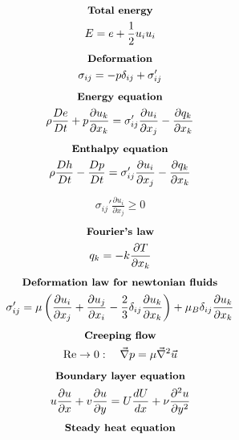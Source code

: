 \documentclass[10pt, a4paper]{article}
\newcommand{\derivative}[2]{\frac{\partial #1}{\partial #2}}
\begin{document}
\begin{multicols*}{2}
\begin{gather*}
        \textbf{\small Total energy} \\
        E = e + \frac12 u_i u_i
    \end{gather*}
    \begin{gather*}
        \textbf{\small Deformation} \\
        \sigma_{ij} = -p \delta_{ij} + \sigma_{ij}'
    \end{gather*}
    \begin{gather*}
        \textbf{\small Energy equation} \\
        \rho \frac{De}{Dt} + p\derivative{ u_k}{x_k} =
        \sigma_{ij}' \derivative{ u_i}{x_j}  - \derivative{ q_k}{x_k}
    \end{gather*}
    \begin{gather*}
        \textbf{\small Enthalpy equation} \\
        \rho \frac{Dh}{Dt} - \frac{Dp}{Dt} =
        \sigma_{ij}' \derivative{ u_i}{x_j}  - \derivative{ q_k}{x_k}
    \end{gather*}
    \begin{gather*}
        \sigma_{ij}' \derivative{ u_i}{x_j} \geq 0
    \end{gather*}
    \begin{gather*}
        \textbf{\small Fourier's law} \\
        q_k = -k\derivative{ T}{x_k}
    \end{gather*}
    \begin{gather*}
        \textbf{\small Deformation law for newtonian fluids} \\
        \sigma_{ij}' = \mu \left( \derivative{ u_i}{x_j} + \derivative{ u_j}{x_i}
        - \frac23\delta_{ij}\derivative{ u_k}{x_k} \right) + \mu_B\delta_{ij}\derivative{ u_k}{x_k}
    \end{gather*}
    \begin{gather*}
        \textbf{\small Creeping flow} \\
        \text{Re} \rightarrow 0: \quad \vec{\nabla}p = \mu \vec{\nabla}^2 \vec{u}
    \end{gather*}
    \begin{gather*}
        \textbf{\small Boundary layer equation} \\
        u\derivative{ u}{x} + v \derivative{ u}{y} =
        U \frac{dU}{dx} + \nu \derivative{^2 u}{y^2}
    \end{gather*}
    \begin{gather*}
        \textbf{\small Steady heat equation} \\

\end{gather*}
\end{multicols*}
\end{document}
